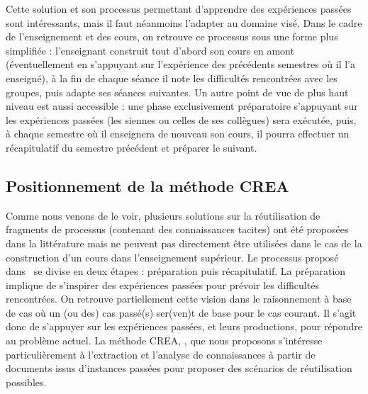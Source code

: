 Cette solution et son processus permettant d'apprendre des expériences passées sont intéressants, mais il faut néanmoins l'adapter au domaine visé.
Dans le cadre de l'enseignement et des cours, on retrouve ce processus sous une forme plus simplifiée : l'enseignant construit tout d'abord son cours en amont (éventuellement en s'appuyant sur l'expérience des précédents semestres où il l'a enseigné), à la fin de chaque séance il note les difficultés rencontrées avec les groupes, puis adapte ses séances suivantes.
Un autre point de vue de plus haut niveau est aussi accessible : une phase exclusivement préparatoire s'appuyant sur les expériences passées (les siennes ou celles de ses collègues) sera exécutée, puis, à chaque semestre où il enseignera de nouveau son cours, il pourra effectuer un récapitulatif du semestre précédent et préparer le suivant.


\bigskip



\subsection{Positionnement de la méthode CREA}
\label{section:Contexte:TravauxConnexes:PositionnementCREA}

Comme nous venons de le voir, plusieurs solutions sur la réutilisation de fragments de processus (contenant des connaissances tacites) ont été proposées dans la littérature mais ne peuvent pas directement être utilisées dans le cas de la construction d'un cours dans l'enseignement supérieur.
Le processus proposé dans~\cite{schacht2016methodology} se divise en deux étapes : préparation puis récapitulatif.
La préparation implique de s'inspirer des expériences passées pour prévoir les difficultés rencontrées.
On retrouve partiellement cette vision dans le raisonnement à base de cas où un (ou des) cas passé(s) ser(ven)t de base pour le cas courant.
Il s'agit donc de s'appuyer sur les expériences passées, et leurs productions, pour répondre au problème actuel.
La méthode CREA, \textit{\MyCREA}, que nous proposons s'intéresse particulièrement à l'extraction et l'analyse de connaissances à partir de documents issus d'instances passées pour proposer des scénarios de réutilisation possibles.

\bigskip

